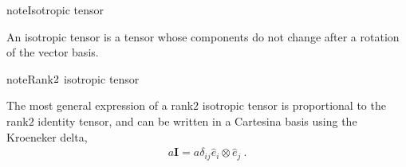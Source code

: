 \documentclass[letterpaper,10pt,english]{jupyterBook}
\begin{document}
\begin{sphinxadmonition}{note}{Isotropic tensor}

\sphinxAtStartPar
An isotropic tensor is a tensor whose components do not change after a rotation of the vector basis.  
\end{sphinxadmonition}

\begin{sphinxadmonition}{note}{Rank\sphinxhyphen{}\protect\(2\protect\) isotropic tensor}

\sphinxAtStartPar
The most general expression of a rank\sphinxhyphen{}\(2\) isotropic tensor is proportional to the rank\sphinxhyphen{}\(2\) identity tensor, and can be written in a Cartesina basis using the Kroeneker delta,
\begin{equation*}
\begin{split}a \mathbf{I} = a \delta_{ij} \hat{e}_i \otimes \hat{e}_j \ .\end{split}
\end{equation*}
\sphinxAtStartPar
{} 
\end{sphinxadmonition}
\end{document}
